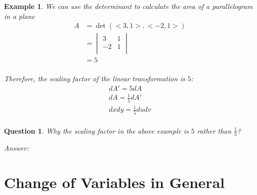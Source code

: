 \documentclass{article}
\newtheorem{example}{Example}
\newtheorem*{question}{Question}
\begin{document}
\begin{example}
  We can use the determinant to calculate the area of a parallelogram in a plane
  \begin{equation*}
    \begin{split}
      A &= \det(<3, 1>, <-2, 1>) \\
        &= \begin{vmatrix}
             3 & 1 \\
             -2 & 1 \\ 
           \end{vmatrix} \\
        &= 5 \\
    \end{split}
  \end{equation*}

  Therefore, the scaling factor of the linear transformation is $5$:
  \begin{gather*}
    dA' = 5dA \\
    dA = \frac{1}{5} dA' \\
    dx dy = \frac{1}{5} du dv \\
  \end{gather*}

\end{example}

\begin{question}
  Why the scaling factor in the above example is $5$ rather than $\frac{1}{5}$?

  Answer:
\end{question}

\section{Change of Variables in General}
\end{document}
